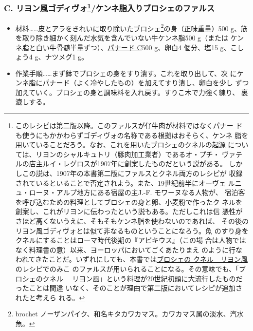 \begin{recette}
{\subsubsection[C.
リヨン風ゴディヴォ/ケンネ脂入りブロシェのファルス]{\texorpdfstring{C.
リヨン風ゴディヴォ\footnote{このレシピは第二版以降。このファルスが仔牛肉が材料ではなくパナー
  ドも使うにもかかわらずゴディヴォの名称である根拠はおそらく、ケンネ
  脂を用いていることだろう。なお、これを用いたブロシェのクネルの起源
  については、リヨンのシャルキュトリ（豚肉加工業者）であるオ・プチ・
  ヴァテルの店主ルイ・レグロスが1907年に創案したものだという説がある。
  しかしこの説は、1907年の本書第二版にファルスとクネル両方のレシピが
  収録されているといることで否定されよう。また、19世紀前半にオーヴェ
  ルニュ・ローヌ・アルプ地方にある宿屋の主J.-F. モワーヌなる人物が、
  宿泊客を呼び込むための料理としてブロシェの身と卵、小麦粉で作ったク
  ネルを創案し、これがリヨンに伝わったという説もある。ただしこれは信
  憑性がさほど高くないうえに、そもそもケンネ脂を使わないのであれば、
  その後のリヨン風ゴディヴォとは似て非なるものということになろう。魚
  のすり身をクネルにすることはローマ時代後期の『アピキウス』（この場
  合は人物ではなく料理書の意）以来、ヨーロッパにおいてごくあたりまえ
  のように行なわれてきたことだ。いずれにしても、本書では\protect\hyperlink{quenelles-de-brochet-lyonnaise}{ブロシェの
  クネル　リヨン風}のレシピでのみこ
  のファルスが用いられることになる。その意味でも、「ブロシェのクネル
  　リヨン風」という料理が20世紀初頭に大流行したものだったことは間違
  いなく、そのことが理由で第二版においてレシピが追加されたと考えら
  れる。}/ケンネ脂入りブロシェのファルス}{C. リヨン風ゴディヴォ/ケンネ脂入りブロシェのファルス}}\label{godiveau-lyonnais}}



\begin{itemize}
\item
  材料\ldots{}\ldots{}皮とアラをきれいに取り除いたブロシェ\footnote{brochet
    ノーザンパイク、和名キタカワカマス。カワカマス属の淡水、汽水魚。}の身（正味重量）500
  g、筋を取り除き細かく刻んだ水気を含んでいない牛ケンネ脂500 g（または
  ケンネ脂と白い牛骨髄半量ずつ）、\protect\hyperlink{panade-c}{パナード
  C}500 g、卵白4 個分、塩15 g、こしょう4 g、ナツメグ1 g。
\item
  作業手順\ldots{}\ldots{}まず鉢でブロシェの身をすり潰す。これを取り出して、次
  にケンネ脂にパナード（よく冷やしたもの）を加えてすり潰し、卵白を少し
  ずつ加えていく。ブロシェの身と調味料を入れ戻す。すりこ木で力強く練り、
  裏漉しする。
\end{itemize}


\end{recette}
